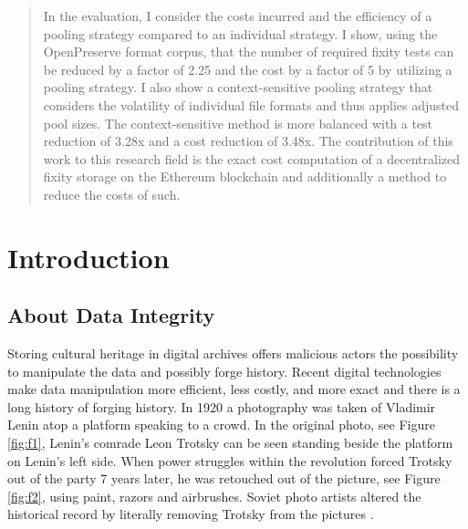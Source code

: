 \documentclass[final]{vutinfth}
\providecommand{\DIFaddend}{} %
\begin{document}
\begin{abstract}
{In the evaluation, I consider the costs incurred and the efficiency of a pooling strategy compared to an individual strategy. I show, using the OpenPreserve format corpus, that the number of required fixity tests can be reduced by a factor of 2.25 and the cost by a factor of 5 by utilizing a pooling strategy. I also show a context-sensitive pooling strategy that considers the volatility of individual file formats and thus applies adjusted pool sizes. The context-sensitive method is more balanced with a test reduction of 3.28x and a cost reduction of 3.48x.
The contribution of this work to this research field is the exact cost computation of a decentralized fixity storage on the Ethereum blockchain and additionally a method to reduce the costs of such. }\DIFaddend \end{abstract}


\tableofcontents 

\mainmatter

\chapter{Introduction}
\section{About Data Integrity}
Storing cultural heritage in digital archives offers malicious actors the possibility to manipulate the data and possibly forge history. Recent digital technologies make data manipulation more efficient, less costly, and more exact and there is a long history of forging history. 
In 1920 a photography was taken of Vladimir Lenin atop a platform speaking to a crowd. In the original photo, see Figure \ref{fig:f1}, Lenin's comrade Leon Trotsky can be seen standing beside the platform on Lenin's left side. When power struggles within the revolution forced Trotsky out of the party 7 years later, he was retouched out of the picture, see Figure \ref{fig:f2}, using paint, razors and airbrushes. Soviet photo artists altered the historical record by literally removing Trotsky from the pictures \cite[3]{hofer2005digital}.
\end{document}
